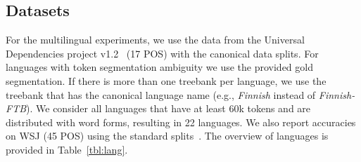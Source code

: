 \documentclass[11pt]{article}
\begin{document}
\subsection{Datasets}

For the multilingual experiments, we use the data from the Universal Dependencies project v1.2~\cite{universal1.2} (17 POS) with the canonical data splits. 
For languages with token segmentation ambiguity we use the provided gold segmentation. If there is more than one treebank per language, we use the treebank that has the canonical language name (e.g.,  \emph{Finnish} instead of \emph{Finnish-FTB}). 
We consider all languages that have at least 60k tokens and are distributed with word forms, resulting in 22 languages. 
We also report accuracies on WSJ (45 POS) using the standard splits~\cite{Collins:02,Manning:11}. The overview of languages is provided in Table~\ref{tbl:lang}.

\begin{table}
\caption{Grouping of languages.}
\label{tbl:lang}
\end{table}
\end{document}
